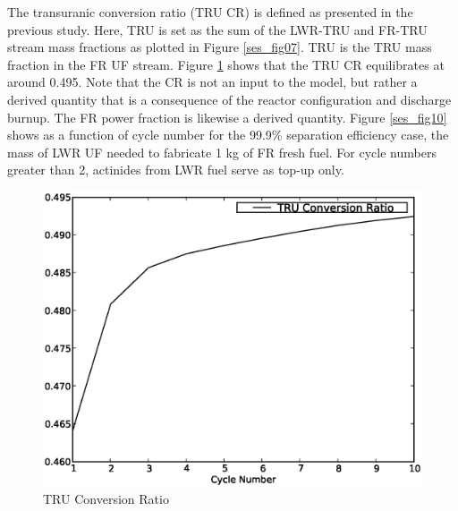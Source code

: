 The transuranic conversion ratio (TRU CR) is defined as presented in the previous study.  
Here, TRU is set as the sum of the LWR-TRU and FR-TRU stream mass
fractions as plotted in Figure \ref{ses_fig07}.  TRU is the TRU 
mass fraction in the FR UF stream.  Figure \ref{ses_fig09} shows that the TRU 
CR equilibrates at around 0.495.  Note that the CR is not an input to the model, but rather a
derived quantity that is a consequence of the reactor configuration and
discharge burnup.  The FR power fraction is likewise a derived quantity.
Figure \ref{ses_fig10} shows as a function of cycle number for the 99.9\% separation
efficiency case, the mass of LWR UF needed to fabricate 1 kg of FR
fresh fuel.  For cycle numbers greater than 2, actinides from LWR fuel
serve as top-up only.  

\begin{figure}[htbp]
\caption{TRU Conversion Ratio}
\label{ses_fig09}
\begin{center}
\includegraphics[scale=0.5]{se_sensitivity/figs/TruCR.eps}
\end{center}
\end{figure}

